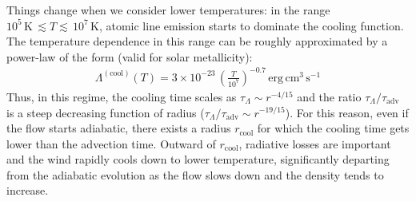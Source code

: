 Things change when we consider lower temperatures: in the range $10^5\,\mathrm{K}\,\lesssim T\lesssim\, 10^7\,\mathrm{K}$, atomic line emission starts to dominate the cooling function. The temperature dependence in this range can be roughly approximated by a power-law of the form \citep{mac_low_cooling} (valid for solar metallicity):
\begin{align}
    \Lambda^\mathrm{(cool)}(T) = 3\times10^{-23}\,\left(\frac{T}{10^7}\right)^{-0.7}\,\mathrm{erg}\,\mathrm{cm}^3\,\mathrm{s}^{-1}
\end{align}
Thus, in this regime, the cooling time scales as $\tau_\Lambda\sim r^{-4/15}$ and the ratio $\tau_\Lambda / \tau_\mathrm{adv}$ is a steep decreasing function of radius ($\tau_\Lambda / \tau_\mathrm{adv} \sim r^{-19/15}$). For this reason, even if the flow starts adiabatic, there exists a radius $r_\mathrm{cool}$ for which the cooling time gets lower than the advection time. Outward of $r_\mathrm{cool}$, radiative losses are important and the wind rapidly cools down to lower temperature, significantly departing from the adiabatic evolution as the flow slows down and the density tends to increase. 

